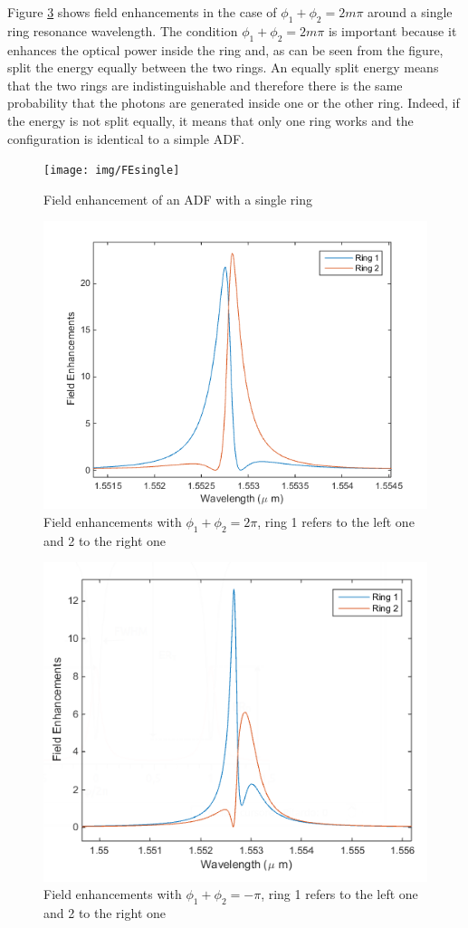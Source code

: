  Figure \ref{FE} shows field enhancements in the case of $\phi_1 + \phi_2 = 2m\pi$ around a single ring resonance wavelength. The condition $\phi_1 + \phi_2 = 2m\pi$ is important because it enhances the optical power inside the ring and, as can be seen from the figure, split the energy equally between the two rings. An equally split energy means that the two rings are indistinguishable and therefore there is the same probability that the photons are generated inside one or the other ring. Indeed, if the energy is not split equally, it means that only one ring works and the configuration is identical to a simple ADF.

\begin{figure}[H]
\centering
\texttt{[image: img/FEsingle]}
\caption{Field enhancement of an ADF with a single ring}
\label{FE}
\end{figure}

\begin{figure}[H]
\centering
\includegraphics[width = .7\textwidth]{img/FE_fase_2pi}
\caption{Field enhancements with $\phi_1+\phi_2 = 2\pi$, ring 1 refers to the left one and 2 to the right one}
\label{FE}
\end{figure}

\begin{figure}[H]
\centering
\includegraphics[width = .7\textwidth]{img/FE_fase_pi}
\caption{Field enhancements with $\phi_1+\phi_2 = -\pi$, ring 1 refers to the left one and 2 to the right one}
\label{FE}
\end{figure}

